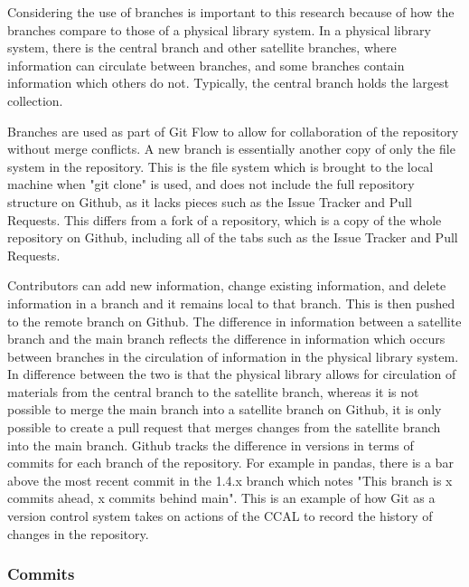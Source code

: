 Considering the use of branches is important to this research because of how the branches compare to those of a physical library system. In a physical library system, there is the central branch and other satellite branches, where information can circulate between branches, and some branches contain information which others do not. Typically, the central branch holds the largest collection. 

Branches are used as part of Git Flow to allow for collaboration of the repository without merge conflicts. A new branch is essentially another copy of only the file system in the repository. This is the file system which is brought to the local machine when "git clone" is used, and does not include the full repository structure on Github, as it lacks pieces such as the Issue Tracker and Pull Requests. This differs from a fork of a repository, which is a copy of the whole repository on Github, including all of the tabs such as the Issue Tracker and Pull Requests. 

Contributors can add new information, change existing information, and delete information in a branch and it remains local to that branch. This is then pushed to the remote branch on Github. The difference in information between a satellite branch and the main branch reflects the difference in information which occurs between branches in the circulation of information in the physical library system. In difference between the two is that the physical library allows for circulation of materials from the central branch to the satellite branch, whereas it is not possible to merge the main branch into a satellite branch on Github, it is only possible to create a pull request that merges changes from the satellite branch into the main branch. Github tracks the difference in versions in terms of commits for each branch of the repository. For example in pandas, there is a bar above the most recent commit in the 1.4.x branch which notes "This branch is x commits ahead, x commits behind main"\cite{pandasrepo}. This is an example of how Git as a version control system takes on actions of the CCAL to record the history of changes in the repository. 

\subsubsection{Commits}

